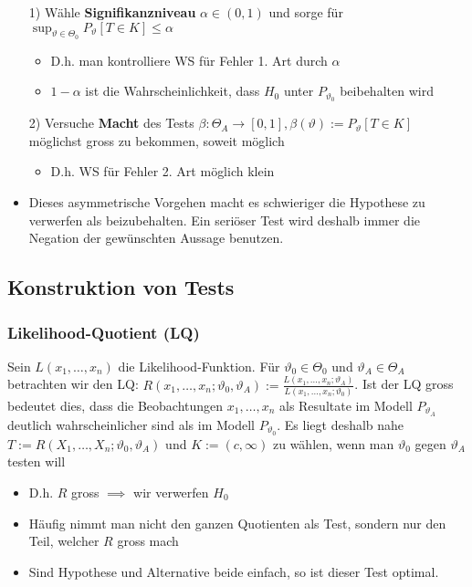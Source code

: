 \begin{itemize}
        \begin{itemize}
            \item[1)] Wähle \textbf{Signifikanzniveau} $\alpha \in (0, 1)$ und sorge für $\sup_{\vartheta \in \Theta_0} P_\vartheta[T \in K] \le \alpha$
                \begin{itemize}
                    \item D.h. man kontrolliere WS für Fehler 1. Art durch $\alpha$
                    \item $1 - \alpha$ ist die Wahrscheinlichkeit, dass $H_0$ unter $P_{\vartheta_0}$ beibehalten wird
                \end{itemize}
            \item[2)] Versuche \textbf{Macht} des Tests $\beta: \Theta_A \to [0, 1], \beta(\vartheta) := P_\vartheta[T \in K]$ möglichst gross zu bekommen, soweit möglich
                \begin{itemize}
                    \item D.h. WS für Fehler 2. Art möglich klein
                \end{itemize}
            \item Dieses asymmetrische Vorgehen macht es schwieriger die Hypothese zu verwerfen als beizubehalten. Ein seriöser Test wird deshalb immer die Negation der gewünschten Aussage benutzen.
        \end{itemize}
\end{itemize}

\subsection{Konstruktion von Tests}
\subsubsection{Likelihood-Quotient (LQ)}
Sein $L(x_1, \dots, x_n)$ die Likelihood-Funktion. Für $\vartheta_0 \in \Theta_0$ und $\vartheta_A \in \Theta_A$ betrachten wir den LQ: $R(x_1, \dots, x_n; \vartheta_0, \vartheta_A) := \frac{L(x_1, \dots, x_n; \vartheta_A)}{L(x_1, \dots, x_n; \vartheta_0)}$. Ist der LQ gross bedeutet dies, dass die Beobachtungen $x_1, \dots, x_n$ als Resultate im Modell $P_{\vartheta_A}$ deutlich wahrscheinlicher sind als im Modell $P_{\vartheta_0}$. Es liegt deshalb nahe $T:= R(X_1, \dots, X_n; \vartheta_0, \vartheta_A)$ und $K := (c, \infty)$ zu wählen, wenn man $\vartheta_0$ gegen $\vartheta_A$ testen will
\begin{itemize}
    \item D.h. $R$ gross $\implies$ wir verwerfen $H_0$
    \item Häufig nimmt man nicht den ganzen Quotienten als Test, sondern nur den Teil, welcher $R$ gross mach
    \item Sind Hypothese und Alternative beide einfach, so ist dieser Test optimal.
\end{itemize}

